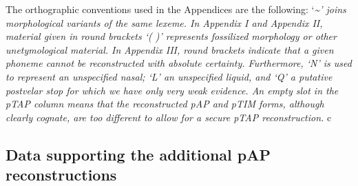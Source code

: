 \documentclass[output=paper]{LSP/langsci}
\begin{document}
\addtocounter{footnote}{-2}

The orthographic conventions used in the Appendices are the following: `\emph{\textup{\~{}' joins morphological variants of the same lexeme. In Appendix I and Appendix II, material given in round brackets `( )' represents fossilized morphology or other unetymological material. In }}\emph{\textup{Appendix III, round brackets indicate that a given phoneme cannot be reconstructed with absolute certainty. Furthermore, `N' is used to represent an unspecified nasal; `L' an unspecified liquid, and `Q' a putative postvelar stop for which we have only very weak evidence. An empty slot in the pTAP column means that the reconstructed pAP and pTIM forms, although clearly cognate, are too different to allow for a secure pTAP reconstruction. }} c

\startappendix
\subsection{Data supporting the additional pAP reconstructions}
 
\end{document}
